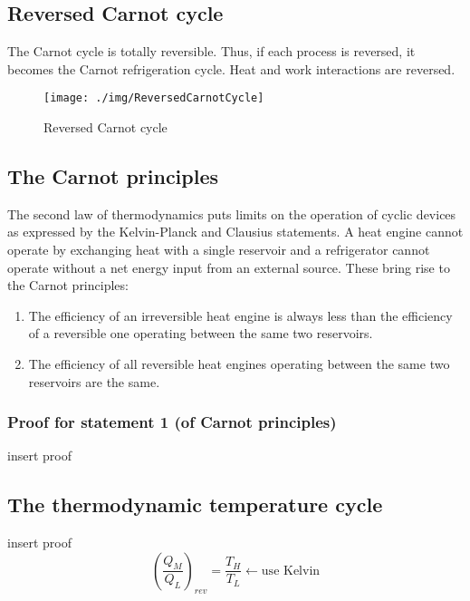 \subsection{Reversed Carnot cycle} \label{reversecarnot}
The Carnot cycle is totally reversible. Thus, if each process is reversed, it becomes the Carnot refrigeration cycle. Heat and work interactions are reversed.
\begin{figure}[H]
  \centering
  \texttt{[image: ./img/ReversedCarnotCycle]}
  \caption{Reversed Carnot cycle}
\end{figure}
\subsection{The Carnot principles}
The second law of thermodynamics puts limits on the operation of cyclic devices as expressed by the Kelvin-Planck and Clausius statements. A heat engine cannot operate by exchanging heat with a single reservoir and a refrigerator cannot operate without a net energy input from an external source. These bring rise to the Carnot principles:
\begin{enumerate}[noitemsep]
  \item The efficiency of an irreversible heat engine is always less than the efficiency of a reversible one operating between the same two reservoirs.
  \item The efficiency of all reversible heat engines operating between the same two reservoirs are the same.
\end{enumerate}
\subsubsection{Proof for statement 1 (of Carnot principles)}
insert proof
\subsection{The thermodynamic temperature cycle}
insert proof
\begin{equation}
  \left( \frac{Q_M}{Q_L} \right)_{rev} = \frac{T_H}{T_L} \leftarrow \textrm{use Kelvin}
\end{equation}
